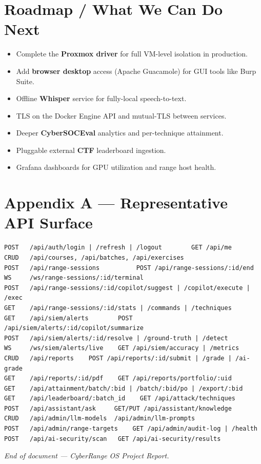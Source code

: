 \documentclass[11pt,a4paper]{article}
\begin{document}
\section{Roadmap / What We Can Do Next}
\begin{itemize}[leftmargin=*]
  \item Complete the \textbf{Proxmox driver} for full VM-level isolation in production.
  \item Add \textbf{browser desktop} access (Apache Guacamole) for GUI tools like Burp Suite.
  \item Offline \textbf{Whisper} service for fully-local speech-to-text.
  \item TLS on the Docker Engine API and mutual-TLS between services.
  \item Deeper \textbf{CyberSOCEval} analytics and per-technique attainment.
  \item Pluggable external \textbf{CTF} leaderboard ingestion.
  \item Grafana dashboards for GPU utilization and range host health.
\end{itemize}

\section*{Appendix A --- Representative API Surface}
\begin{lstlisting}
POST   /api/auth/login | /refresh | /logout        GET /api/me
CRUD   /api/courses, /api/batches, /api/exercises
POST   /api/range-sessions          POST /api/range-sessions/:id/end
WS     /ws/range-sessions/:id/terminal
POST   /api/range-sessions/:id/copilot/suggest | /copilot/execute | /exec
GET    /api/range-sessions/:id/stats | /commands | /techniques
GET    /api/siem/alerts        POST /api/siem/alerts/:id/copilot/summarize
POST   /api/siem/alerts/:id/resolve | /ground-truth | /detect
WS     /ws/siem/alerts/live    GET /api/siem/accuracy | /metrics
CRUD   /api/reports    POST /api/reports/:id/submit | /grade | /ai-grade
GET    /api/reports/:id/pdf    GET /api/reports/portfolio/:uid
GET    /api/attainment/batch/:bid | /batch/:bid/po | /export/:bid
GET    /api/leaderboard/:batch_id    GET /api/attack/techniques
POST   /api/assistant/ask     GET/PUT /api/assistant/knowledge
CRUD   /api/admin/llm-models  /api/admin/llm-prompts
POST   /api/admin/range-targets    GET /api/admin/audit-log | /health
POST   /api/ai-security/scan   GET /api/ai-security/results
\end{lstlisting}

\vspace{1cm}
\begin{center}
\small\itshape End of document --- CyberRange OS Project Report.
\end{center}
\end{document}
